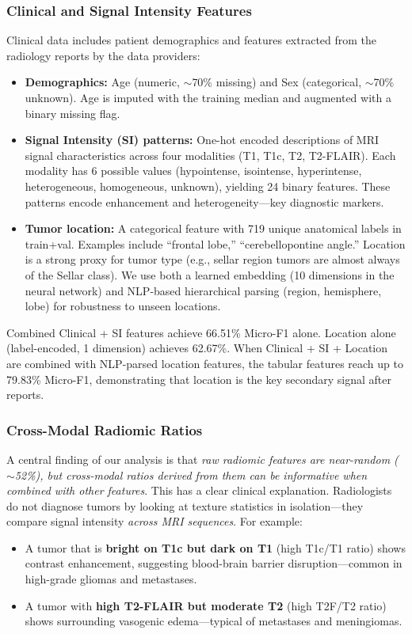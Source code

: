 \subsubsection{Clinical and Signal Intensity Features}

Clinical data includes patient demographics and features extracted from the radiology reports by the data providers:

\begin{itemize}
  \item \textbf{Demographics:} Age (numeric, $\sim$70\% missing) and Sex (categorical, $\sim$70\% unknown). Age is imputed with the training median and augmented with a binary missing flag.
  \item \textbf{Signal Intensity (SI) patterns:} One-hot encoded descriptions of MRI signal characteristics across four modalities (T1, T1c, T2, T2-FLAIR). Each modality has 6 possible values (hypointense, isointense, hyperintense, heterogeneous, homogeneous, unknown), yielding 24 binary features. These patterns encode enhancement and heterogeneity---key diagnostic markers.
  \item \textbf{Tumor location:} A categorical feature with 719 unique anatomical labels in train+val. Examples include ``frontal lobe,'' ``cerebellopontine angle.'' Location is a strong proxy for tumor type (e.g., sellar region tumors are almost always of the Sellar class). We use both a learned embedding (10 dimensions in the neural network) and NLP-based hierarchical parsing (region, hemisphere, lobe) for robustness to unseen locations.
\end{itemize}

Combined Clinical + SI features achieve 66.51\% Micro-F1 alone. Location alone (label-encoded, 1 dimension) achieves 62.67\%. When Clinical + SI + Location are combined with NLP-parsed location features, the tabular features reach up to 79.83\% Micro-F1, demonstrating that location is the key secondary signal after reports.

\subsubsection{Cross-Modal Radiomic Ratios}

A central finding of our analysis is that \emph{raw radiomic features are near-random ($\sim$52\%), but cross-modal ratios derived from them can be informative when combined with other features}. This has a clear clinical explanation. Radiologists do not diagnose tumors by looking at texture statistics in isolation---they compare signal intensity \emph{across MRI sequences}. For example:
\begin{itemize}
  \item A tumor that is \textbf{bright on T1c but dark on T1} (high T1c/T1 ratio) shows contrast enhancement, suggesting blood-brain barrier disruption---common in high-grade gliomas and metastases.
  \item A tumor with \textbf{high T2-FLAIR but moderate T2} (high T2F/T2 ratio) shows surrounding vasogenic edema---typical of metastases and meningiomas.
\end{itemize}

